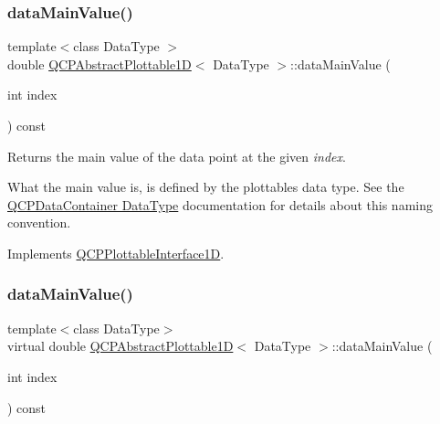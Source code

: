 \subsubsection{\texorpdfstring{data\+Main\+Value()}{dataMainValue()}\hspace{0.1cm}{\footnotesize\ttfamily [1/2]}}
{\footnotesize\ttfamily template$<$class Data\+Type $>$ \\
double \hyperlink{class_q_c_p_abstract_plottable1_d}{Q\+C\+P\+Abstract\+Plottable1D}$<$ Data\+Type $>$\+::data\+Main\+Value (\begin{DoxyParamCaption}\item[{int}]{index }\end{DoxyParamCaption}) const\hspace{0.3cm}{\ttfamily [virtual]}}





Returns the main value of the data point at the given {\itshape index}.

What the main value is, is defined by the plottable\textquotesingle{}s data type. See the \hyperlink{class_q_c_p_data_container_qcpdatacontainer-datatype}{Q\+C\+P\+Data\+Container Data\+Type} documentation for details about this naming convention. 

Implements \hyperlink{class_q_c_p_plottable_interface1_d_af6330919e8023277d08c958a6074fc76}{Q\+C\+P\+Plottable\+Interface1D}.

\mbox{\label{class_q_c_p_abstract_plottable1_d_a104b2e36cf4d4ea29f7247887a193842}} 
\subsubsection{\texorpdfstring{data\+Main\+Value()}{dataMainValue()}\hspace{0.1cm}{\footnotesize\ttfamily [2/2]}}
{\footnotesize\ttfamily template$<$class Data\+Type$>$ \\
virtual double \hyperlink{class_q_c_p_abstract_plottable1_d}{Q\+C\+P\+Abstract\+Plottable1D}$<$ Data\+Type $>$\+::data\+Main\+Value (\begin{DoxyParamCaption}\item[{int}]{index }\end{DoxyParamCaption}) const\hspace{0.3cm}{\ttfamily [virtual]}}

